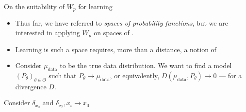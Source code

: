 \documentclass[pdf,aspectratio=169,10pt]{beamer}
\begin{document}
\begin{frame}{On the suitability of $W_p$ for learning}

\begin{itemize}
    \item Thus far, we have referred to \emph{spaces of probability functions}, but we are interested in applying $W_p$ on spaces of .
    \item Learning is such a space requires, more than a distance, a notion of 
    \item Consider $\mu_\text{data}$ to be the true data distribution. We want to find a model $(P_\theta)_{\theta\in\Theta}$ such that $P_\theta \to \mu_\text{data}$, or equivalently, $D(\mu_\text{data},P_\theta)\to 0$ --- for a  divergence $D$.
\end{itemize}
\vspace{2em}
\centerline{ Consider $\delta_{x_0}$ and $\delta_{x_i}, x_i\to x_0$}

\end{frame}
\end{document}
